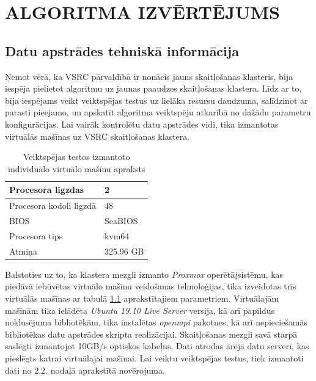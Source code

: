 \chapter{ALGORITMA IZVĒRTĒJUMS} \label{algorithm-eval}


\section{Datu apstrādes tehniskā informācija}


Ņemot vērā, ka VSRC pārvaldībā ir nonācis jauns skaitļošanas klasteris, bija iespēja pielietot algoritmu uz jaunas paaudzes skaitļošanas klastera. Līdz ar to, bija iespējams veikt veiktspējas testus uz lielāka resursu daudzuma, salīdzinot ar parasti pieejamo, un apskatīt algoritma veiktspēju atkarībā no dažādu parametru konfigurācijas. Lai vairāk kontrolētu datu apstrādes vidi, tika izmantotas virtuālās mašīnas uz VSRC skaitļošanas klastera.


\begin{table}[h!]
\centering
\caption{Veiktspējas testos izmantoto individuālo virtuālo mašīnu apraksts}
\begin{tabular}{|l|l|}
        \hline
        Procesora ligzdas & 2 \\ \hline
        Procesora kodoli ligzdā & 48 \\ \hline
        BIOS   & SeaBIOS    \\ \hline
        Procesora tips    & kvm64   \\ \hline
        Atmiņa & 325.96 GB                    \\ \hline
        \end{tabular}
        
        \label{tab:vm-info}
\end{table}


Balstoties uz to, ka klastera mezgli izmanto \textit{Proxmox} operētājsistēmu, kas piedāvā iebūvētas virtuālo mašīnu veidošanas tehnoloģijas, tika izveidotas trīs virtuālās mašīnas ar tabulā \ref{tab:vm-info} aprakstītajiem parametriem. Virtuālajām mašīnām tika ielādēta \textit{Ubuntu 19.10 Live Server} versija, kā arī papildus noklusējuma bibliotēkām, tika instalētas \textit{openmpi} pakotnes, kā arī nepieciešamās bibliotēkas datu apstrādes skripta realizācijai. Skaitļošanas mezgli savā starpā saslēgti izmantojot 10GB/s optiskos kabeļus. Dati atrodas ārējā datu serverī, kas pieslēgts katrai virtuālajai mašīnai. Lai veiktu veiktspējas testus, tiek izmantoti dati no 2.2. nodaļā aprakstītā novērojuma.


